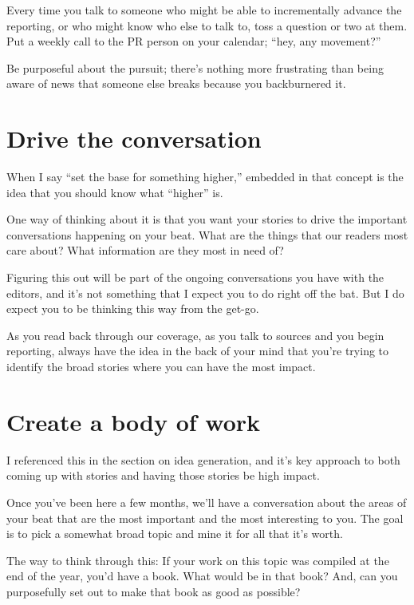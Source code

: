 \documentclass[
  12pt,
  american,
  letterpaperpaper,
  extrafontsizes,onecolumn,openright
  ]{memoir}
\begin{document}
Every time you talk to someone who might be able to incrementally advance the reporting, or who might know who else to talk to, toss a question or two at them. Put a weekly call to the PR person on your calendar; \enquote{hey, any movement?}

Be purposeful about the pursuit; there's nothing more frustrating than being aware of news that someone else breaks because you backburnered it.

\hypertarget{drive-the-conversation}{%
\section*{Drive the conversation}\label{drive-the-conversation}}

When I say \enquote{set the base for something higher,} embedded in that concept is the idea that you should know what \enquote{higher} is.

One way of thinking about it is that you want your stories to drive the important conversations happening on your beat. What are the things that our readers most care about? What information are they most in need of?

Figuring this out will be part of the ongoing conversations you have with the editors, and it's not something that I expect you to do right off the bat. But I do expect you to be thinking this way from the get-go.

As you read back through our coverage, as you talk to sources and you begin reporting, always have the idea in the back of your mind that you're trying to identify the broad stories where you can have the most impact.

\hypertarget{create-a-body-of-work}{%
\section*{Create a body of work}\label{create-a-body-of-work}}

I referenced this in the section on idea generation, and it's key approach to both coming up with stories and having those stories be high impact.

Once you've been here a few months, we'll have a conversation about the areas of your beat that are the most important and the most interesting to you. The goal is to pick a somewhat broad topic and mine it for all that it's worth.

The way to think through this: If your work on this topic was compiled at the end of the year, you'd have a book. What would be in that book? And, can you purposefully set out to make that book as good as possible?
\end{document}
